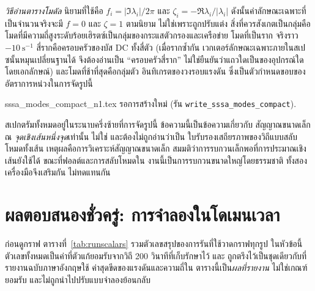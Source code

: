 \documentclass[12pt,a4paper]{article}
\begin{document}
\emph{วิธีอ่านตารางโมดัล} นิยามที่ใช้คือ $f_i=|\Im\lambda_i|/2\pi$ และ
$\zeta_i=-\Re\lambda_i/|\lambda_i|$ ดังนั้นค่าลักษณะเฉพาะที่เป็นจำนวนจริงจะมี
$f=0$ และ $\zeta=1$ ตามนิยาม ไม่ใช่เพราะถูกปรับแต่ง สิ่งที่ควรสังเกตเป็นกลุ่มคือ
โมดที่มีความถี่สูงระดับร้อยเฮิรตซ์เป็นกลุ่มของกระแสตัวกรองและเครือข่าย โมดที่เป็นราก
จริงราว $-10~\mathrm{s}^{-1}$ สี่รากคือครอบครัวของบัส DC ทั้งสี่ตัว (เมื่อรากซ้ำกัน
เวกเตอร์ลักษณะเฉพาะภายในสเปซนั้นหมุนเปลี่ยนฐานได้ จึงต้องอ่านเป็น ``ครอบครัวสี่ราก''
ไม่ใช่ยืนยันว่าแถวใดเป็นของอุปกรณ์ใดโดยเอกลักษณ์) และโมดที่ช้าที่สุดคือกลุ่มตัว
อินทิเกรตของวงรอบแรงดัน ซึ่งเป็นตัวกำหนดขอบของอัตราการหน่วงในการจัดรูปนี้

\begin{center}\footnotesize
{}
 {}
 {\ttfamily sssa\_modes\_compact\_n1.tex รอการสร้างใหม่
  (รัน \texttt{write\_sssa\_modes\_compact}).}
\end{center}

สเปกตรัมทั้งหมดอยู่ในระนาบครึ่งซ้ายที่การจัดรูปนี้ ข้อความนี้เป็นข้อความเกี่ยวกับ
สัญญาณขนาดเล็ก ณ \emph{จุดเชิงเส้นหนึ่งจุด}เท่านั้น ไม่ใช่ และต้องไม่ถูกอ่านว่าเป็น
ใบรับรองเสถียรภาพของวิถีแบบสลับโหมดทั้งเส้น เหตุผลคือการวิเคราะห์สัญญาณขนาดเล็ก
สมมติว่าการรบกวนเล็กพอที่การประมาณเชิงเส้นยังใช้ได้ ขณะที่ฟอลต์และการสลับโหมดใน
งานนี้เป็นการรบกวนขนาดใหญ่โดยธรรมชาติ ทั้งสองเครื่องมือจึงเสริมกัน ไม่ทดแทนกัน

\section{ผลตอบสนองชั่วครู่: การจำลองในโดเมนเวลา}\label{sec:transient}
ก่อนดูกราฟ ตารางที่~\ref{tab:runscalars} รวมตัวเลขสรุปของการรันที่ใช้วาดกราฟทุกรูป
ในหัวข้อนี้ ตัวเลขทั้งหมดเป็นค่าที่ตัวแก้ยอมรับจากวิถี 200 วินาทีที่เก็บรักษาไว้ และ
ถูกตรึงไว้เป็นชุดเดียวกับที่รายงานฉบับภาษาอังกฤษใช้ ค่าสุดขีดของแรงดันและความถี่ใน
ตารางนี้เป็น\emph{ผลที่รายงาน} ไม่ใช่เกณฑ์ยอมรับ และไม่ถูกนำไปปรับแบบจำลองย้อนกลับ
\end{document}
